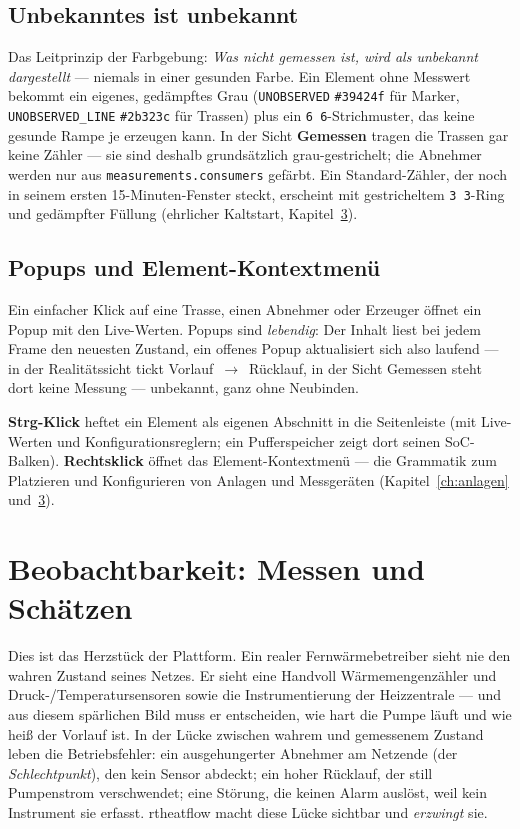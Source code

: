 \documentclass[11pt,a4paper,parskip=half]{scrreprt}
\newcommand{\ui}[1]{\textsf{\bfseries #1}}
\newcommand{\api}[1]{\texttt{#1}}
\begin{document}
\section{Unbekanntes ist unbekannt}
\label{sec:unbekannt}

Das Leitprinzip der Farbgebung: \emph{Was nicht gemessen ist, wird als
unbekannt dargestellt} --- niemals in einer \glqq gesunden\grqq{} Farbe. Ein
Element ohne Messwert bekommt ein eigenes, gedämpftes Grau
(\texttt{UNOBSERVED} \texttt{\#39424f} für Marker, \texttt{UNOBSERVED\_LINE}
\texttt{\#2b323c} für Trassen) plus ein \texttt{6\,6}-Strichmuster, das keine
gesunde Rampe je erzeugen kann. In der Sicht \ui{Gemessen} tragen die Trassen
gar keine Zähler --- sie sind deshalb grundsätzlich grau-gestrichelt; die
Abnehmer werden nur aus \api{measurements.consumers} gefärbt. Ein
Standard-Zähler, der noch in seinem ersten 15-Minuten-Fenster steckt, erscheint
mit gestricheltem \texttt{3\,3}-Ring und gedämpfter Füllung (ehrlicher
Kaltstart, Kapitel~\ref{ch:beobachtbarkeit}).

\section{Popups und Element-Kontextmenü}

Ein einfacher Klick auf eine Trasse, einen Abnehmer oder Erzeuger öffnet ein
Popup mit den Live-Werten. Popups sind \emph{lebendig}: Der Inhalt liest bei
jedem Frame den neuesten Zustand, ein offenes Popup aktualisiert sich also
laufend --- in der Realitätssicht tickt \glqq Vorlauf~$\rightarrow$~Rücklauf\grqq,
in der Sicht Gemessen steht dort \glqq keine Messung --- unbekannt\grqq, ganz
ohne Neubinden.

\ui{Strg-Klick} heftet ein Element als eigenen Abschnitt in die Seitenleiste
(mit Live-Werten und Konfigurationsreglern; ein Pufferspeicher zeigt dort seinen
SoC-Balken). \ui{Rechtsklick} öffnet das Element-Kontextmenü --- die
Grammatik zum Platzieren und Konfigurieren von Anlagen und Messgeräten
(Kapitel~\ref{ch:anlagen} und~\ref{ch:beobachtbarkeit}).

\chapter{Beobachtbarkeit: Messen und Schätzen}
\label{ch:beobachtbarkeit}

Dies ist das Herzstück der Plattform. Ein realer Fernwärmebetreiber sieht nie
den wahren Zustand seines Netzes. Er sieht eine Handvoll Wärmemengenzähler und
Druck-/Temperatursensoren sowie die Instrumentierung der Heizzentrale --- und
aus diesem spärlichen Bild muss er entscheiden, wie hart die Pumpe läuft und wie
heiß der Vorlauf ist. In der Lücke zwischen wahrem und gemessenem Zustand leben
die Betriebsfehler: ein ausgehungerter Abnehmer am Netzende (der
\emph{Schlechtpunkt}), den kein Sensor abdeckt; ein hoher Rücklauf, der still
Pumpenstrom verschwendet; eine Störung, die keinen Alarm auslöst, weil kein
Instrument sie erfasst. rtheatflow macht diese Lücke sichtbar und
\emph{erzwingt} sie.
\end{document}
